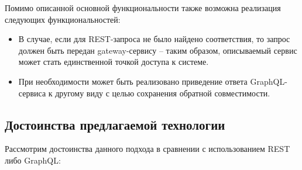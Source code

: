 Помимо описанной основной функциональности также возможна реализация следующих функциональностей:

\begin{itemize}
	\item В случае, если для REST-запроса не было найдено соответствия, то запрос должен быть передан gateway-сервису – таким образом, описываемый сервис может стать единственной точкой доступа к системе.
	\item При необходимости может быть реализовано приведение ответа GraphQL-сервиса к другому виду с целью сохранения обратной совместимости.
\end{itemize}

\subsection{Достоинства предлагаемой технологии}\label{sec:proposed-technology-advantages}

Рассмотрим достоинства данного подхода в сравнении с использованием REST либо GraphQL:

